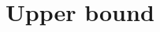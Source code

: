 \newcommand{\counterstart}{s}
\newcommand{\counterrows}{\floor*{\frac{N-4}{12l + 90}}}
\newcommand{\seedheight}{12l + 94}
\newcommand{\rowheight}{12l + 90}
\part{Upper bound}
\label{sec:prelims}






